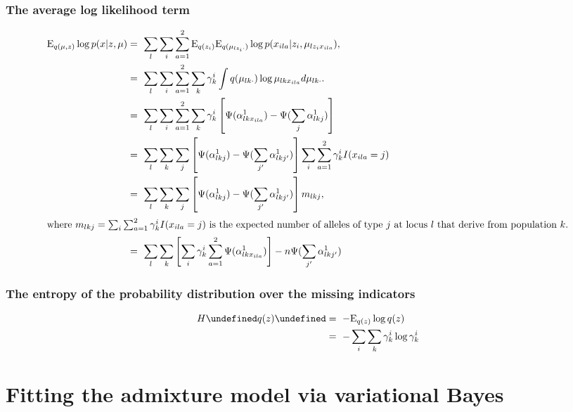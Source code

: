 \documentclass[12pt,a4paper,reqno]{article}
\newcommand{\E}{\text{E}{}}
\let\(\undefined
\let\)\undefined
\newcommand{\(}{\left(}
\newcommand{\)}{\right)}
\newcommand{\|}{\arrowvert}
\renewcommand{\digamma}{\Psi}
\begin{document}
\subsubsection{The average log likelihood term}
\begin{align*}
  \E_{q(\mu,z)} \log p(x|z,\mu) 
  &=~ \sum_{l} \sum_{i} \sum_{a=1}^{2} \E_{q(z_{i})} \E_{q(\mu_{lz_{i}\cdot})} \log p(x_{ila}|z_{i},\mu_{lz_{i}x_{ila}}), \\
  &=~ \sum_{l} \sum_{i} \sum_{a=1}^{2} \sum_{k} \gamma^{i}_{k} \int q(\mu_{lk\cdot})\log \mu_{lkx_{ila}} d\mu_{lk\cdot}. \\
  &=~ \sum_{l} \sum_{i} \sum_{a=1}^{2} \sum_{k} \gamma^{i}_{k} \left[\digamma(\alpha^{1}_{lkx_{ila}}) - \digamma(\sum_{j}\alpha^{1}_{lkj})\right]\\
  &=~ \sum_{l} \sum_{k} \sum_{j} \left[\digamma(\alpha^{1}_{lkj}) - \digamma(\sum_{j'}\alpha^{1}_{lkj'})\right] \sum_{i} \sum_{a=1}^{2} \gamma^{i}_{k}I(x_{ila}=j) \\
  &=~ \sum_{l} \sum_{k} \sum_{j} \left[\digamma(\alpha^{1}_{lkj}) - \digamma(\sum_{j'}\alpha^{1}_{lkj'})\right] m_{lkj}, \\
\intertext{where $m_{lkj} = \sum_{i} \sum_{a=1}^{2} \gamma^{i}_{k}I(x_{ila}=j)$ is the expected number of alleles of type $j$ at locus $l$ that derive from population $k$.}
  &=~ \sum_{l} \sum_{k} \left[\sum_{i}\gamma^{i}_{k}\sum_{a=1}^{2}\digamma(\alpha^{1}_{lkx_{ila}})\right] - n\digamma(\sum_{j'}\alpha^{1}_{lkj'})
\end{align*}
\subsubsection{The entropy of the probability distribution over the missing indicators}

\begin{align*}
  H\(q(z)\) 
  &=~ -\E_{q(z)} \log q(z) \\
  &=~ -\sum_{i} \sum_{k} \gamma^{i}_{k} \log \gamma^{i}_{k}\\
\end{align*}



\newpage{}
\section{Fitting the admixture model via variational Bayes}
\end{document}
